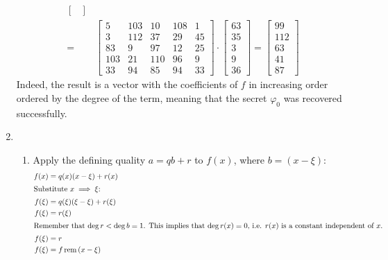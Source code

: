 \documentclass[11pt,a4paper]{article}
\begin{document}
\begin{enumerate}
\begin{align*}
\begin{bmatrix}
                                                   \end{bmatrix}               \\
              =         & \begin{bmatrix}
                              5   & 103 & 10  & 108 & 1  \\
                              3   & 112 & 37  & 29  & 45 \\
                              83  & 9   & 97  & 12  & 25 \\
                              103 & 21  & 110 & 96  & 9  \\
                              33  & 94  & 85  & 94  & 33
                          \end{bmatrix} \cdot \begin{bmatrix}
                                                  63 \\ 35 \\ 3 \\ 9 \\ 36
                                              \end{bmatrix} = \begin{bmatrix}
                                                                  99 \\ 112 \\ 63 \\ 41 \\ 87
                                                              \end{bmatrix}
          \end{align*}
          Indeed, the result is a vector with the coefficients of $f$ in increasing order ordered by the degree of the term, meaning that the
          secret $\varphi_0$ was recovered successfully.
          \newpage

    \item \begin{enumerate}
              \item Apply the defining quality $a = qb + r$ to $f(x)$, where $b = (x - \xi)$:
                    \begin{align*}
                        f(x)   & = q(x)(x - \xi) + r(x)       \\
                        \intertext{Substitute $x \implies \xi$:}
                        f(\xi) & = q(\xi)(\xi - \xi) + r(\xi) \\
                        f(\xi) & = r(\xi)                     \\
                        \intertext{Remember that $\deg{r} < \deg{b} = 1$. This implies that $\deg{r(x)} = 0$, i.e.
                            $r(x)$ is a constant independent of $x$.}
                        f(\xi) & = r                          \\
                        f(\xi) & = f\operatorname{rem}{(x - \xi)}
                    \end{align*}


\end{enumerate}
\end{enumerate}
\end{document}
